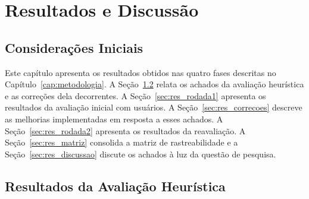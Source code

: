 %
%
\chapter{Resultados e Discussão}
\label{cap:resultados}

\section{Considerações Iniciais}
\label{sec:res_consideracoes}

Este capítulo apresenta os resultados obtidos nas quatro fases descritas no
Capítulo~\ref{cap:metodologia}. A Seção~\ref{sec:res_heuristica} relata os achados
da avaliação heurística e as correções dela decorrentes. A
Seção~\ref{sec:res_rodada1} apresenta os resultados da avaliação inicial com
usuários. A Seção~\ref{sec:res_correcoes} descreve as melhorias implementadas em
resposta a esses achados. A Seção~\ref{sec:res_rodada2} apresenta os resultados da
reavaliação. A Seção~\ref{sec:res_matriz} consolida a matriz de rastreabilidade e
a Seção~\ref{sec:res_discussao} discute os achados à luz da questão de pesquisa.

\section{Resultados da Avaliação Heurística}
\label{sec:res_heuristica}


